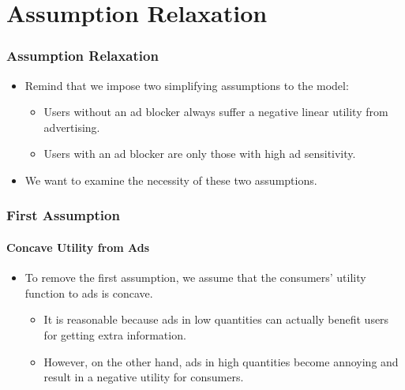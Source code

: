 \documentclass{beamer}
\newcommand{\hl}[1]{\textcolor{myblue}{#1}}
\begin{document}
\section{Assumption Relaxation}
\begin{frame}[label=current]
    \frametitle{Assumption Relaxation}
    \begin{itemize}
        \item Remind that we impose two simplifying assumptions to the model:
            \begin{itemize}
                \item Users without an ad blocker always suffer a negative linear
                    utility from advertising.
                \item Users with an ad blocker are only those with high ad sensitivity.
            \end{itemize}
        \item We want to examine the necessity of these two assumptions.
    \end{itemize}
\end{frame}

\begin{frame}[label=current]
    \frametitle{First Assumption}
    \framesubtitle{Concave Utility from Ads}
    \begin{itemize}
        \item To remove the first assumption, we assume that the consumers' utility function
            to ads is \hl{concave}.
            \begin{itemize}
                \item It is reasonable because ads in low quantities can actually benefit users
                    for getting extra information.
                \item However, on the other hand, ads in high quantities become annoying and
                    result in a negative utility for consumers.
            \end{itemize}
    \end{itemize}
\end{frame}
\end{document}

